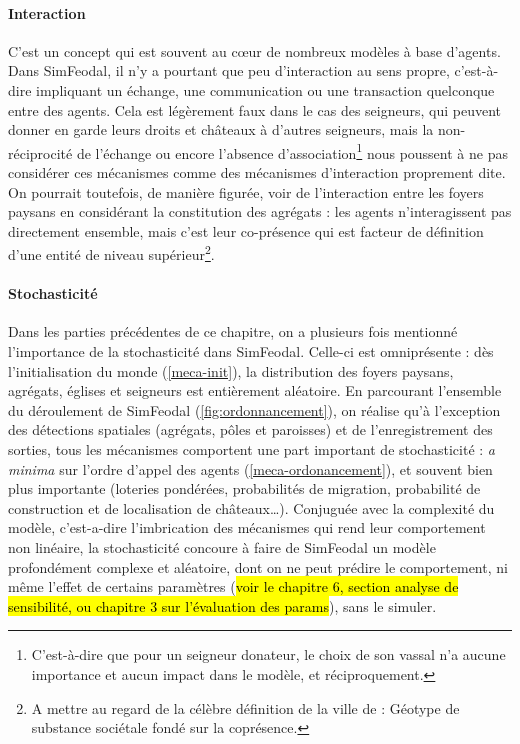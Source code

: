 \paragraph{Interaction} C'est un concept qui est souvent au cœur de nombreux modèles à base d'agents. Dans SimFeodal, il n'y a pourtant que peu d'interaction au sens propre, c'est-à-dire impliquant un échange, une communication ou une transaction quelconque entre des agents.
Cela est légèrement faux dans le cas des seigneurs, qui peuvent donner en garde leurs droits et châteaux à d'autres seigneurs, mais la non-réciprocité de l'échange ou encore l'absence d'\fg{}association\fg{}\footnote{
	C'est-à-dire que pour un seigneur donateur, le choix de son vassal n'a aucune importance et aucun impact dans le modèle, et réciproquement.
} nous poussent à ne pas considérer ces mécanismes comme des mécanismes d'interaction proprement dite.
On pourrait toutefois, de manière figurée, voir de l'interaction entre les foyers paysans en considérant la constitution des agrégats : les agents n'interagissent pas directement ensemble, mais c'est leur co-présence qui est facteur de définition d'une entité de niveau supérieur\footnote{
A mettre au regard de la célèbre définition de la ville de \textcite{levy_ville_2003} : \og Géotype de substance sociétale fondé sur la coprésence\fg{}.
}.

\paragraph{Stochasticité} Dans les parties précédentes de ce chapitre, on a plusieurs fois mentionné l'importance de la stochasticité dans SimFeodal.
Celle-ci est omniprésente : dès l'initialisation du monde (\cref{meca-init}), la distribution des foyers paysans, agrégats, églises et seigneurs est entièrement aléatoire.
En parcourant l'ensemble du déroulement de SimFeodal (\cref{fig:ordonnancement}), on réalise qu'à l'exception des détections spatiales (agrégats, pôles et paroisses) et de l'enregistrement des sorties, tous les mécanismes comportent une part important de stochasticité : \textit{a minima} sur l'ordre d'appel des agents (\cref{meca-ordonancement}), et souvent bien plus importante (loteries pondérées, probabilités de migration, probabilité de construction et de localisation de châteaux\ldots).
Conjuguée avec la complexité du modèle, c'est-a-dire l'imbrication des mécanismes qui rend leur comportement non linéaire, la stochasticité concoure à faire de SimFeodal un modèle profondément complexe et aléatoire, dont on ne peut prédire le comportement, ni même l'effet de certains paramètres (\hl{voir le chapitre 6, section analyse de sensibilité, ou chapitre 3 sur l'évaluation des params}), sans le simuler.


